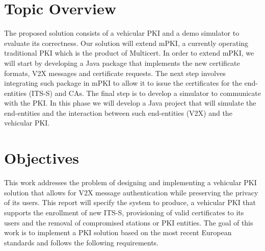 \section{Topic Overview}
\label{contributions}
The proposed solution consists of a vehicular PKI and a demo simulator to evaluate its correctness. Our solution will extend mPKI, a currently operating traditional PKI which is the product of Multicert. In order to extend mPKI, we will start by developing a Java package that implements the new certificate formats, V2X messages and certificate requests. The next step involves integrating such package in mPKI to allow it to issue the certificates for the end-entities (ITS-S) and CAs. The final step is to develop a simulator to communicate with the PKI. In this phase we will develop a Java project that will simulate the end-entities and the interaction between such end-entities (V2X) and the vehicular PKI. 



\section{Objectives}
\label{goals}

This work addresses the problem of designing and implementing a vehicular PKI solution that allows for V2X message authentication while preserving the privacy of its users. This report will specify the system to produce, a vehicular PKI that supports the enrollment of new ITS-S, provisioning of valid certificates to its users and the removal of compromised stations or PKI entities. The goal of this work is to implement a PKI solution based on the most recent European standards and follows the following requirements.

